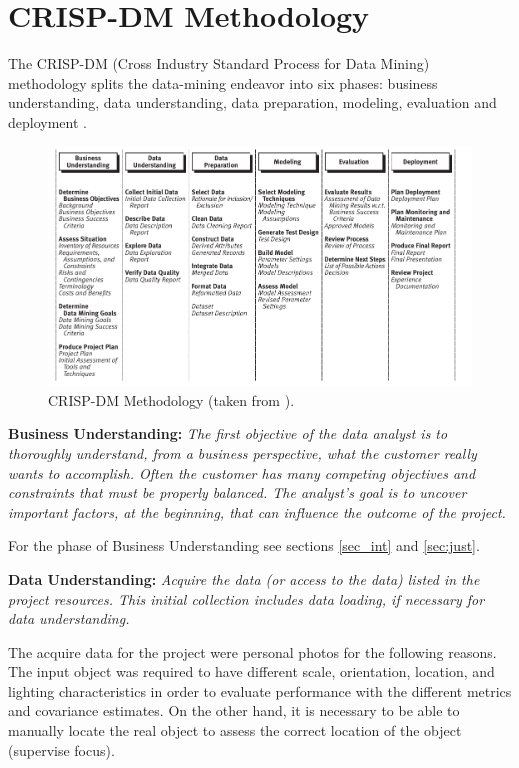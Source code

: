\documentclass[11pt]{article}
\theoremstyle{definition}
\theoremstyle{remark}
\theoremstyle{remark}
\theoremstyle{remark}
\begin{document}
\section{CRISP-DM Methodology}\label{sec:crisp}
The CRISP-DM (Cross Industry Standard Process for Data Mining) methodology
splits the data-mining endeavor into six phases: business understanding, data
understanding, data preparation, modeling, evaluation and deployment
\cite{Chapman2000CRISPDM1S}.

\begin{figure}[H]
  \centering \includegraphics[width = 0.8\linewidth]{crisp-dm.png}
  \caption{CRISP-DM Methodology (taken from \cite{Chapman2000CRISPDM1S}).}
  \label{fig:crisp-dm}
\end{figure}

\textbf{Business Understanding:} \textit{The first objective of the data analyst
  is to thoroughly understand, from a business perspective, what the customer
  really wants to accomplish. Often the customer has many competing objectives
  and constraints that must be properly balanced. The analyst’s goal is to
  uncover important factors, at the beginning, that can influence the outcome of
  the project.}

For the phase of Business Understanding see sections \ref{sec_int} and
\ref{sec:just}.

\textbf{Data Understanding:} \textit{Acquire the data (or access to the data)
  listed in the project resources. This initial collection includes data
  loading, if necessary for data understanding.}

The acquire data for the project were personal photos for the following reasons.
The input object was required to have different scale, orientation, location,
and lighting characteristics in order to evaluate performance with the different
metrics and covariance estimates. On the other hand, it is necessary to be able
to manually locate the real object to assess the correct location of the object
(supervise focus).
\end{document}
